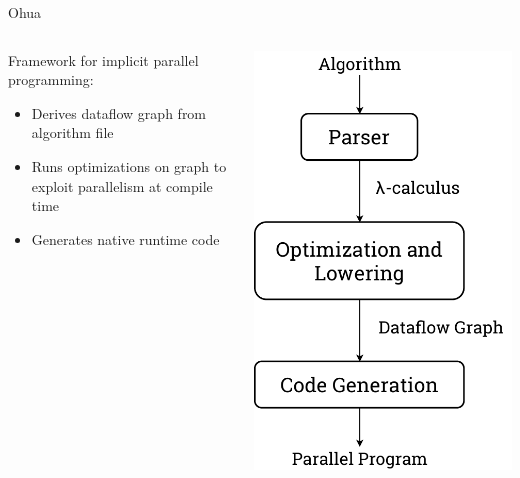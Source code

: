 \documentclass[aspectratio=169, usenames, dvipsnames]{beamer}
\begin{document}
\begin{frame}{Ohua\footnotemark[2]}
  \begin{columns}
    \begin{column}{0.7\textwidth}
      Framework for implicit parallel programming:\\[.55\baselineskip]
      \begin{itemize}
        \item<2-> Derives dataflow graph from algorithm file
        \item<3-> Runs optimizations on graph to exploit parallelism at compile time
        \item<4-> Generates native runtime code
      \end{itemize}

      \vspace{1.5em}

    \end{column}
    \begin{column}{0.25\textwidth}
      \includegraphics[width=\textwidth,height=\textheight,keepaspectratio]{img/ohua}
    \end{column}
  \end{columns}


\end{frame}
\end{document}
